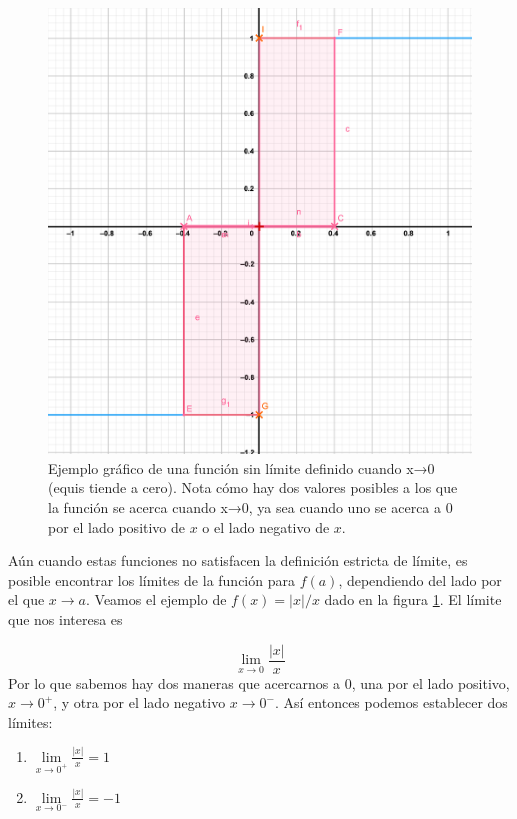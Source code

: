 \documentclass[
]{book}
\providecommand{\tightlist}{%
  \setlength{\itemsep}{0pt}\setlength{\parskip}{0pt}}
\begin{document}
\begin{figure}

{\centering \includegraphics{Unidad-III/Limite-abs-x} 

}

\caption{Ejemplo gráfico de una función sin límite definido cuando x→0 (equis tiende a cero). Nota cómo hay dos valores posibles a los que la función se acerca cuando x→0, ya sea cuando uno se acerca a 0 por el lado positivo de $x$ o el lado negativo de $x$.}\label{fig:limite-indef}
\end{figure}

Aún cuando estas funciones no satisfacen la definición estricta de límite, es posible encontrar los límites de la función para \(f(a)\), dependiendo del lado por el que \(x \rightarrow a\). Veamos el ejemplo de \(f(x) = |x|/x\) dado en la figura \ref{fig:limite-indef}. El límite que nos interesa es

\[ \lim \limits_{x \rightarrow 0} \frac{|x|}{x}\]
Por lo que sabemos hay dos maneras que acercarnos a \(0\), una por el lado positivo, \(x \rightarrow 0^{+}\), y otra por el lado negativo \(x \rightarrow 0^-\). Así entonces podemos establecer dos límites:

\begin{enumerate}
\def\labelenumi{\arabic{enumi}.}
\tightlist
\item
  \(\lim \limits_{x \rightarrow 0^+} \frac{|x|}{x} = 1\)
\item
  \(\lim \limits_{x \rightarrow 0^-} \frac{|x|}{x} = -1\)
\end{enumerate}
\end{document}

